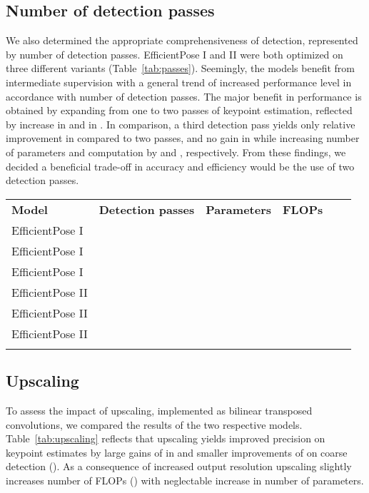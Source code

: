 \subsection*{Number of detection passes}
\label{sec:passes}

We also determined the appropriate comprehensiveness of detection, represented by number of detection passes. EfficientPose I and II were both optimized on three different variants (Table~\ref{tab:passes}). Seemingly, the models benefit from intermediate supervision with a general trend of increased performance level in accordance with number of detection passes. The major benefit in performance is obtained by expanding from one to two passes of keypoint estimation, reflected by  increase in  and  in . In comparison, a third detection pass yields only  relative improvement in  compared to two passes, and no gain in  while increasing number of parameters and computation by  and , respectively. From these findings, we decided a beneficial trade-off in accuracy and efficiency would be the use of two detection passes.

\begin{table*}
\centering
\caption{Model accuracy on the MPII validation dataset in relation to the number of detection passes}
\label{tab:passes}       
\begin{tabular}{llllll}
\hline\noalign{\smallskip}
\textbf{Model} & \textbf{Detection passes} & \textbf{Parameters} & \textbf{FLOPs} &  &   \\
\noalign{\smallskip}\hline\noalign{\smallskip}
EfficientPose I &  &  &  &  &  \\
EfficientPose I &  &  &  &  &  \\
EfficientPose I &  &  &  &  &  \\
EfficientPose II &  &  &  &  &  \\
EfficientPose II &  &  &  &  &  \\
EfficientPose II &  &  &  &  &  \\
\noalign{\smallskip}\hline
\end{tabular}
\end{table*}

\subsection*{Upscaling}
\label{sec:upscaling}

To assess the impact of upscaling, implemented as bilinear transposed convolutions, we compared the results of the two respective models. Table~\ref{tab:upscaling} reflects that upscaling yields improved precision on keypoint estimates by large gains of  in  and smaller improvements of  on coarse detection (). As a consequence of increased output resolution upscaling slightly increases number of FLOPs () with neglectable increase in number of parameters.

